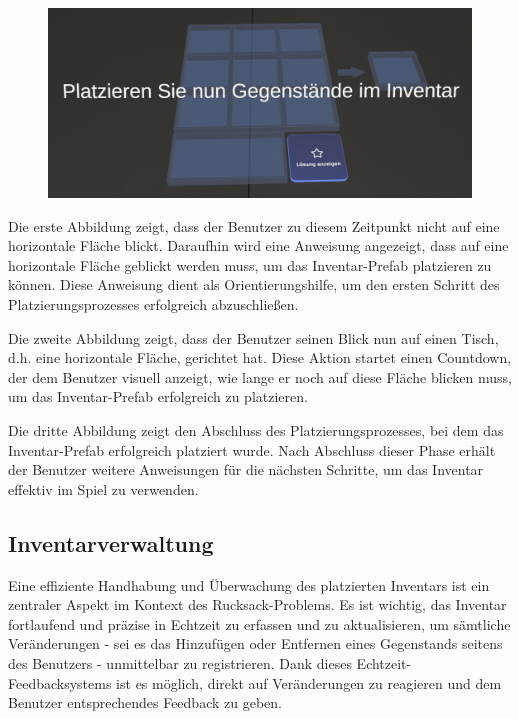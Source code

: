 \begin{figure}[H]
\begin{minipage}[b]{0.30\textwidth}
        \centering
        \includegraphics[width=\textwidth]{images/schrittdrei.png}
        \label{fig:drei}
    \end{minipage}
\end{figure}

Die erste Abbildung zeigt, dass der Benutzer zu diesem Zeitpunkt nicht auf eine horizontale Fläche blickt. Daraufhin
wird eine Anweisung angezeigt, dass auf eine horizontale Fläche geblickt werden muss, um das Inventar-Prefab platzieren
zu können. Diese Anweisung dient als Orientierungshilfe, um den ersten Schritt des Platzierungsprozesses erfolgreich
abzuschließen.

Die zweite Abbildung zeigt, dass der Benutzer seinen Blick nun auf einen Tisch, d.h. eine horizontale Fläche, gerichtet
hat. Diese Aktion startet einen Countdown, der dem Benutzer visuell anzeigt, wie lange er noch auf diese Fläche blicken
muss, um das Inventar-Prefab erfolgreich zu platzieren.

Die dritte Abbildung zeigt den Abschluss des Platzierungsprozesses, bei dem das Inventar-Prefab erfolgreich platziert
wurde. Nach Abschluss dieser Phase erhält der Benutzer weitere Anweisungen für die nächsten Schritte, um das Inventar
effektiv im Spiel zu verwenden.

\subsection{Inventarverwaltung}
Eine effiziente Handhabung und Überwachung des platzierten Inventars ist ein zentraler Aspekt im Kontext des Rucksack-Problems.
Es ist wichtig, das Inventar fortlaufend und präzise in Echtzeit zu erfassen und zu aktualisieren, um sämtliche Veränderungen -
sei es das Hinzufügen oder Entfernen eines Gegenstands seitens des Benutzers - unmittelbar zu registrieren. Dank dieses
Echtzeit-Feedbacksystems ist es möglich, direkt auf Veränderungen zu reagieren und dem Benutzer entsprechendes Feedback zu geben.

